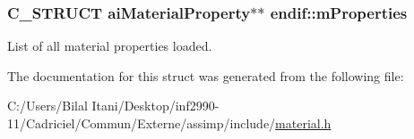 \subsubsection[{\texorpdfstring{m\+Properties}{mProperties}}]{\setlength{\rightskip}{0pt plus 5cm}C\+\_\+\+S\+T\+R\+U\+CT ai\+Material\+Property$\ast$$\ast$ endif\+::m\+Properties}\hypertarget{structendif_a95295db8cbd37f02553457d84d65068a}{}\label{structendif_a95295db8cbd37f02553457d84d65068a}
List of all material properties loaded. 

The documentation for this struct was generated from the following file\+:\begin{DoxyCompactItemize}
\item 
C\+:/\+Users/\+Bilal Itani/\+Desktop/inf2990-\/11/\+Cadriciel/\+Commun/\+Externe/assimp/include/\hyperlink{material_8h}{material.\+h}\end{DoxyCompactItemize}
